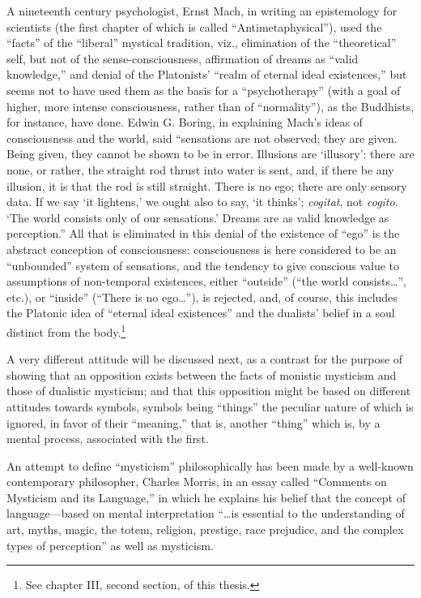 A nineteenth century psychologist, Ernst Mach, in writing
an epistemology for scientists\supercite{boring:experimental-psychology}
(the first chapter of which is called \enquote{Antimetaphysical}), used the \enquote{facts} of the
\enquote{liberal} mystical tradition, viz., elimination of the \enquote{theoretical} self,
but not of the sense-consciousness, affirmation of dreams as
\enquote{valid knowledge,} and denial of the Platonists' \enquote{realm of eternal ideal existences,}
but seems not to have used them as the basis for a \enquote{psychotherapy}
(with a goal of higher, more intense consciousness, rather than
of \enquote{normality}), as the Buddhists, for instance, have done. Edwin G. Boring,\supercite{boring:experimental-psychology}
in explaining Mach's ideas of consciousness and the world, said \enquote{sensations are not observed; they are given. Being given,
they cannot be shown to be in error. Illusions are \enquote*{illusory}: there are none,
or rather, the straight rod thrust into water is sent, and, if there
be any illusion, it is that the rod is still straight. There is no ego;
there are only sensory data. If we say \enquote*{it lightens,} we ought also to say, \enquote*{it thinks};
\emph{cogitat}, not \emph{cogito}. \enquote*{The world consists only of our sensations.}
Dreams are as valid knowledge as perception.}\supercite{boring:experimental-psychology}
All that is eliminated in this denial of the existence of \enquote{ego} is
the abstract conception of consciousness: consciousness is
here considered to be an \enquote{unbounded} system of sensations, and
the tendency to give conscious value to assumptions of
non-temporal existences, either \enquote{outside} (\enquote{the world consists\dots}, etc.),
or \enquote{inside} (\enquote{There is no ego\dots}), is
rejected, and, of course, this includes the Platonic idea
of \enquote{eternal ideal existences} and the dualists' belief in
a soul distinct from the body.\footnote{See chapter III, second section, of this thesis.}

A very different attitude will be discussed next, as a
contrast for the purpose of showing that an opposition exists
between the facts of monistic mysticism and those of dualistic
mysticism; and that this opposition might be based on different
attitudes towards symbols, symbols being \enquote{things} the
peculiar nature of which is ignored, in favor of their
\enquote{meaning,} that is, another \enquote{thing} which is, by a mental
process, associated with the first.

An attempt to define \enquote{mysticism} philosophically has
been made by a well-known contemporary philosopher, Charles
Morris, in an essay called \enquote{Comments on Mysticism and its Language,}\supercite{hayakawa:language-meaning-maturity}
in which he explains his belief that the concept of language---based on
mental interpretation \enquote{\dots is essential to the understanding of art,
myths, magic, the totem, religion, prestige, race prejudice, and the complex types of perception}\supercite{hayakawa:language-meaning-maturity}
as well as mysticism.

